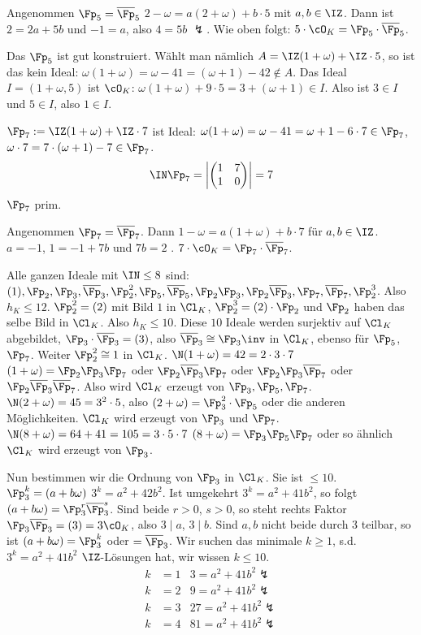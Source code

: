 \begin{Beispiel}
\begin{enumerate}
Angenommen $\Fp_5=\overline\Fp_5$ \folge $2-\omega = a(2+\omega)+b\cdot 5$ mit $a,b\in\IZ$. Dann ist $2=2a+5b$ und $-1=a$, also $4=5b$ $\lightning$.
Wie oben folgt: $5\cdot \cO_K=\Fp_5\cdot\overline\Fp_5$.

Das $\Fp_5$ ist gut konstruiert. Wählt man nämlich $A=\IZ(1+\omega)+\IZ \cdot 5$, so ist das kein Ideal: $\omega(1+\omega)=\omega-41=(\omega+1)-42 \not\in A$.
Das Ideal $I=(1+\omega,5)$ ist $\cO_K$: $\omega(1+\omega)+9\cdot 5=3+(\omega+1)\in I$. Also ist $3\in I$ und $5\in I$, also $1\in I$.

$\Fp_7:= \IZ(1+\omega)+\IZ\cdot 7$ ist Ideal: $\omega(1+\omega)=\omega-41=\omega+1-6\cdot 7\in\Fp_7$, $\omega\cdot 7= 7\cdot(\omega+1)-7\in\Fp_7$.
\[ \IN\Fp_7=\left|\begin{pmatrix}
                   1 &7\\ 1&0
                  \end{pmatrix}
 \right|=7\]
 \folge $\Fp_7$ prim.
 
 Angenommen $\Fp_7=\overline\Fp_7$. Dann $1-\omega=a(1+\omega)+b\cdot 7$ für $a,b\in\IZ$. \folge $a=-1$, $1=-1+7b$ und $7b=2$ \lightning. \folge $7\cdot\cO_K=\Fp_7\cdot\overline\Fp_7$.
 
 Alle ganzen Ideale mit $\IN\leq 8$ sind: $(1),\Fp_2,\Fp_3,\overline\Fp_3,\Fp_2^2,\Fp_5,\overline\Fp_5,\Fp_2\Fp_3,\Fp_2\overline\Fp_3,\Fp_7,\overline\Fp_7,\Fp_2^3$. Also $h_K\leq 12$. $\Fp_2^2=(2)$ mit Bild $1$ in $\Cl_K$, $\Fp_2^3=(2)\cdot\Fp_2$ und $\Fp_2$ haben das selbe Bild in $\Cl_K$. Also $h_K\leq 10$.
 Diese $10$ Ideale werden surjektiv auf $\Cl_K$ abgebildet, $\Fp_3\cdot \overline\Fp_3=(3)$, also $\overline\Fp_3\cong \Fp_3\inv$ in $\Cl_K$, ebenso für $\Fp_5$, $\Fp_7$.
 Weiter $\Fp_2^2\cong 1$ in $\Cl_K$. $\N(1+\omega)=42=2\cdot 3\cdot 7$ \folge $(1+\omega)=\Fp_2\Fp_3\Fp_7$ oder $\Fp_2\overline\Fp_3\Fp_7$ oder $\Fp_2\Fp_3\overline{\Fp}_7$ oder $\Fp_2\overline\Fp_3\overline\Fp_7$. Also wird $\Cl_K$ erzeugt von $\Fp_3,\Fp_5,\Fp_7$. $\N(2+\omega)=45=3^2\cdot 5$, also $(2+\omega)=\Fp_3^2\cdot \Fp_5$ oder die anderen Möglichkeiten. \folge $\Cl_K$ wird erzeugt von $\Fp_3$ und $\Fp_7$. $\N(8+\omega)=64+41=105=3\cdot 5\cdot 7$ \folge $(8+\omega)=\Fp_3\Fp_5\Fp_7$ oder so ähnlich \folge $\Cl_K$ wird erzeugt von $\Fp_3$.
 
 Nun bestimmen wir die Ordnung von $\Fp_3$ in $\Cl_K$. Sie ist $\leq 10$. $\Fp_3^k=(a+b\omega)$ \folge $3^k=a^2+42b^2$. Ist umgekehrt $3^k=a^2+41b^2$, so folgt $(a+b\omega)=\Fp_3^r\overline\Fp_3^s$. Sind beide $r>0$, $s>0$, so steht rechts Faktor $\Fp_3\overline\Fp_3=(3)=3\cO_K$, also $3\mid a$, $3\mid b$. Sind $a,b$ nicht beide durch $3$ teilbar, so ist $(a+b\omega)=\Fp_3^k$ oder $=\overline\Fp_3$. Wir suchen das minimale $k\geq 1$, s.d. $3^k=a^2+41b^2$ 
 $\IZ$-Lösungen hat, wir wissen $k\leq 10$.
 \begin{align*}
  k&=1 & 3=a^2+41b^2 \lightning\\
  k&=2 & 9=a^2+41b^2 \lightning\\
  k&=3 & 27=a^2+41b^2 \lightning\\
  k&=4 & 81=a^2+41b^2 \lightning\\
 \end{align*}
 

\end{enumerate}
\end{Beispiel}
